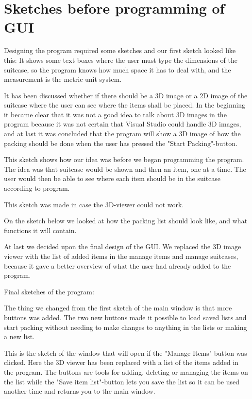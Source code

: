 \section{Sketches before programming of GUI}
Designing the program required some sketches and our first sketch looked like this:
It shows some text boxes where the user must type the dimensions of the suitcase, so the program knows how much space it has to deal with, and the measurement is the metric unit system.


It has been discussed whether if there should be a 3D image or a 2D image of the suitcase where the user can see where the items shall be placed. In the beginning it became clear that it was not a good idea to talk about 3D images in the program because it was not certain that Visual Studio could handle 3D images, and at last it was concluded that the program will show a 3D image of how the packing should be done when the user has pressed the "Start Packing"-button.

This sketch shows how our idea was before we began programming the program. The idea was that suitcase would be shown and then an item, one at a time. The user would then be able to see where each item should be in the suitcase according to program.


This sketch was made in case the 3D-viewer could not work.

On the sketch below we looked at how the packing list should look like, and what functions it will contain.


At last we decided upon the final design of the GUI. We replaced the 3D image viewer with the list of added items in the manage items and manage suitcases, because it gave a better overview of what the user had already added to the program. 

Final sketches of the program:

The thing we changed from the first sketch of the main window is that more buttons was added. The two new buttons made it possible to load saved lists and start packing without needing to make changes to anything in the lists or making a new list.


This is the sketch of the window that will open if the "Manage Items"-button was clicked. Here the 3D viewer has been replaced with a list of the items added in the program. The buttons are tools for adding, deleting or managing the items on the list while the "Save item list"-button lets you save the list so it can be used another time and returns you to the main window.


